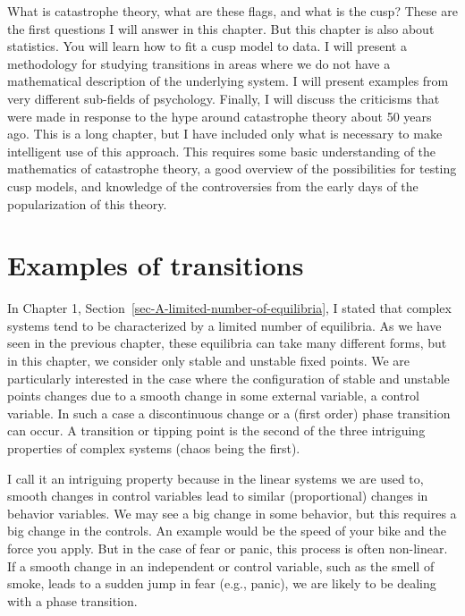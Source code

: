 \documentclass[
  a4paper,
  DIV=11,
  numbers=noendperiod,
  oneside]{scrreprt}
\begin{document}
What is catastrophe theory, what are these flags, and what is the cusp?
These are the first questions I will answer in this chapter. But this
chapter is also about statistics. You will learn how to fit a cusp model
to data. I will present a methodology for studying transitions in areas
where we do not have a mathematical description of the underlying
system. I will present examples from very different sub-fields of
psychology. Finally, I will discuss the criticisms that were made in
response to the hype around catastrophe theory about 50 years ago. This
is a long chapter, but I have included only what is necessary to make
intelligent use of this approach. This requires some basic understanding
of the mathematics of catastrophe theory, a good overview of the
possibilities for testing cusp models, and knowledge of the
controversies from the early days of the popularization of this theory.

\hypertarget{sec-Examples-of-transitions}{%
\section{Examples of transitions}\label{sec-Examples-of-transitions}}

In Chapter 1, Section~\ref{sec-A-limited-number-of-equilibria}, I stated
that complex systems tend to be characterized by a limited number of
equilibria. As we have seen in the previous chapter, these equilibria
can take many different forms, but in this chapter, we consider only
stable and unstable fixed points. We are particularly interested in the
case where the configuration of stable and unstable points changes due
to a smooth change in some external variable, a control variable. In
such a case a discontinuous change or a (first order) phase transition
can occur. A transition or tipping point is the second of the three
intriguing properties of complex systems (chaos being the first).

I call it an intriguing property because in the linear systems we are
used to, smooth changes in control variables lead to similar
(proportional) changes in behavior variables. We may see a big change in
some behavior, but this requires a big change in the controls. An
example would be the speed of your bike and the force you apply. But in
the case of fear or panic, this process is often non-linear. If a smooth
change in an independent or control variable, such as the smell of
smoke, leads to a sudden jump in fear (e.g., panic), we are likely to be
dealing with a phase transition.
\end{document}
